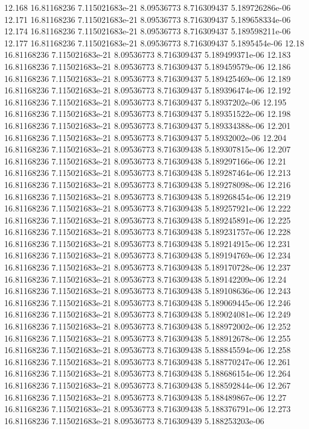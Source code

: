 {12.168 16.81168236 7.115021683e-21 8.09536773 8.716309437 5.189726286e-06
12.171 16.81168236 7.115021683e-21 8.09536773 8.716309437 5.189658334e-06
12.174 16.81168236 7.115021683e-21 8.09536773 8.716309437 5.189598211e-06
12.177 16.81168236 7.115021683e-21 8.09536773 8.716309437 5.1895454e-06
12.18 16.81168236 7.115021683e-21 8.09536773 8.716309437 5.189499371e-06
12.183 16.81168236 7.115021683e-21 8.09536773 8.716309437 5.189459579e-06
12.186 16.81168236 7.115021683e-21 8.09536773 8.716309437 5.189425469e-06
12.189 16.81168236 7.115021683e-21 8.09536773 8.716309437 5.189396474e-06
12.192 16.81168236 7.115021683e-21 8.09536773 8.716309437 5.18937202e-06
12.195 16.81168236 7.115021683e-21 8.09536773 8.716309437 5.189351522e-06
12.198 16.81168236 7.115021683e-21 8.09536773 8.716309437 5.189334388e-06
12.201 16.81168236 7.115021683e-21 8.09536773 8.716309437 5.18932002e-06
12.204 16.81168236 7.115021683e-21 8.09536773 8.716309438 5.189307815e-06
12.207 16.81168236 7.115021683e-21 8.09536773 8.716309438 5.189297166e-06
12.21 16.81168236 7.115021683e-21 8.09536773 8.716309438 5.189287464e-06
12.213 16.81168236 7.115021683e-21 8.09536773 8.716309438 5.189278098e-06
12.216 16.81168236 7.115021683e-21 8.09536773 8.716309438 5.189268454e-06
12.219 16.81168236 7.115021683e-21 8.09536773 8.716309438 5.189257921e-06
12.222 16.81168236 7.115021683e-21 8.09536773 8.716309438 5.189245891e-06
12.225 16.81168236 7.115021683e-21 8.09536773 8.716309438 5.189231757e-06
12.228 16.81168236 7.115021683e-21 8.09536773 8.716309438 5.189214915e-06
12.231 16.81168236 7.115021683e-21 8.09536773 8.716309438 5.189194769e-06
12.234 16.81168236 7.115021683e-21 8.09536773 8.716309438 5.189170728e-06
12.237 16.81168236 7.115021683e-21 8.09536773 8.716309438 5.189142209e-06
12.24 16.81168236 7.115021683e-21 8.09536773 8.716309438 5.189108636e-06
12.243 16.81168236 7.115021683e-21 8.09536773 8.716309438 5.189069445e-06
12.246 16.81168236 7.115021683e-21 8.09536773 8.716309438 5.189024081e-06
12.249 16.81168236 7.115021683e-21 8.09536773 8.716309438 5.188972002e-06
12.252 16.81168236 7.115021683e-21 8.09536773 8.716309438 5.188912678e-06
12.255 16.81168236 7.115021683e-21 8.09536773 8.716309438 5.188845594e-06
12.258 16.81168236 7.115021683e-21 8.09536773 8.716309438 5.188770247e-06
12.261 16.81168236 7.115021683e-21 8.09536773 8.716309438 5.188686154e-06
12.264 16.81168236 7.115021683e-21 8.09536773 8.716309438 5.188592844e-06
12.267 16.81168236 7.115021683e-21 8.09536773 8.716309438 5.188489867e-06
12.27 16.81168236 7.115021683e-21 8.09536773 8.716309438 5.188376791e-06
12.273 16.81168236 7.115021683e-21 8.09536773 8.716309439 5.188253203e-06
}
